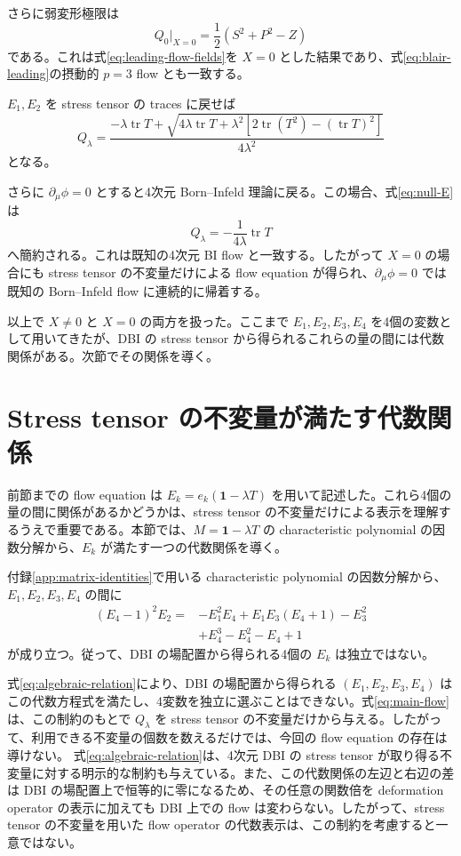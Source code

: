 \documentclass[a4paper,11pt]{ltjsarticle}
\numberwithin{equation}{section}
\newcommand{\tr}{\operatorname{tr}}
\newcommand{\Id}{\mathbf 1}
\begin{document}
さらに弱変形極限は
\begin{equation}
 Q_0\big|_{X=0}=\frac12\left(S^2+P^2-Z\right)
 \label{eq:null-weak-limit}
\end{equation}
である。これは式\eqref{eq:leading-flow-fields}を $X=0$ とした結果であり、式\eqref{eq:blair-leading}の摂動的 $p=3$ flow とも一致する。

$E_1,E_2$ を stress tensor の traces に戻せば
\begin{equation}
 Q_\lambda
 =\frac{-\lambda\tr T+
 \sqrt{4\lambda\tr T+\lambda^2\left[2\tr(T^2)-(\tr T)^2\right]}}
 {4\lambda^2}
 \label{eq:null-T}
\end{equation}
となる。

さらに $\partial_\mu\phi=0$ とすると4次元 Born--Infeld 理論に戻る。この場合、式\eqref{eq:null-E}は
\begin{equation}
 Q_\lambda=-\frac{1}{4\lambda}\tr T
 \label{eq:pure-BI}
\end{equation}
へ簡約される。これは既知の4次元 BI flow と一致する\cite{Ferko2022,Brizio2026}。したがって $X=0$ の場合にも stress tensor の不変量だけによる flow equation が得られ、$\partial_\mu\phi=0$ では既知の Born--Infeld flow に連続的に帰着する。

以上で $X\neq0$ と $X=0$ の両方を扱った。ここまで $E_1,E_2,E_3,E_4$ を4個の変数として用いてきたが、DBI の stress tensor から得られるこれらの量の間には代数関係がある。次節でその関係を導く。

\section{Stress tensor の不変量が満たす代数関係}
\label{sec:constraint}

前節までの flow equation は $E_k=e_k(\Id-\lambda T)$ を用いて記述した。これら4個の量の間に関係があるかどうかは、stress tensor の不変量だけによる表示を理解するうえで重要である。本節では、$M=\Id-\lambda T$ の characteristic polynomial の因数分解から、$E_k$ が満たす一つの代数関係を導く。

付録\ref{app:matrix-identities}で用いる characteristic polynomial の因数分解から、$E_1,E_2,E_3,E_4$ の間に
\begin{align}
 (E_4-1)^2E_2={}&-E_1^2E_4+E_1E_3(E_4+1)-E_3^2\nonumber\\
 &+E_4^3-E_4^2-E_4+1
 \label{eq:algebraic-relation}
\end{align}
が成り立つ。従って、DBI の場配置から得られる4個の $E_k$ は独立ではない。

式\eqref{eq:algebraic-relation}により、DBI の場配置から得られる $(E_1,E_2,E_3,E_4)$ はこの代数方程式を満たし、4変数を独立に選ぶことはできない。式\eqref{eq:main-flow}は、この制約のもとで $Q_\lambda$ を stress tensor の不変量だけから与える。したがって、利用できる不変量の個数を数えるだけでは、今回の flow equation の存在は導けない。
式\eqref{eq:algebraic-relation}は、4次元 DBI の stress tensor が取り得る不変量に対する明示的な制約も与えている。また、この代数関係の左辺と右辺の差は DBI の場配置上で恒等的に零になるため、その任意の関数倍を deformation operator の表示に加えても DBI 上での flow は変わらない。したがって、stress tensor の不変量を用いた flow operator の代数表示は、この制約を考慮すると一意ではない。
\end{document}
